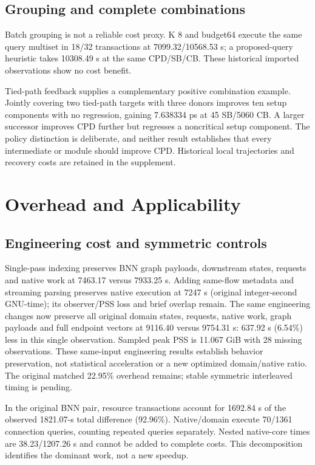 \documentclass[conference,10pt]{IEEEtran}
\begin{document}
\subsection{Grouping and complete combinations}
Batch grouping is not a reliable cost proxy. K 8 and budget64 execute the same query multiset in 18/32 transactions at 7099.32/10568.53 s; a proposed-query heuristic takes 10308.49 s at the same CPD/SB/CB. These historical imported observations show no cost benefit.

Tied-path feedback supplies a complementary positive combination example. Jointly covering two tied-path targets with three donors improves ten setup components with no regression, gaining 7.638334 ps at 45 SB/5060 CB. A larger successor improves CPD further but regresses a noncritical setup component. The policy distinction is deliberate, and neither result establishes that every intermediate or module should improve CPD. Historical local trajectories and recovery costs are retained in the supplement.
\section{Overhead and Applicability}
\subsection{Engineering cost and symmetric controls}
Single-pass indexing preserves BNN graph payloads, downstream states, requests and native work at 7463.17 versus 7933.25 s. Adding same-flow metadata and streaming parsing preserves native execution at 7247 s (original integer-second GNU-time); its observer/PSS loss and brief overlap remain. The same engineering changes now preserve all original domain states, requests, native work, graph payloads and full endpoint vectors at 9116.40 versus 9754.31 s: 637.92 s (6.54\%) less in this single observation. Sampled peak PSS is 11.067 GiB with 28 missing observations. These same-input engineering results establish behavior preservation, not statistical acceleration or a new optimized domain/native ratio. The original matched 22.95\% overhead remains; stable symmetric interleaved timing is pending.

In the original BNN pair, resource transactions account for 1692.84 s of the observed 1821.07-s total difference (92.96\%). Native/domain execute 70/1361 connection queries, counting repeated queries separately. Nested native-core times are 38.23/1207.26 s and cannot be added to complete costs. This decomposition identifies the dominant work, not a new speedup.
\end{document}

